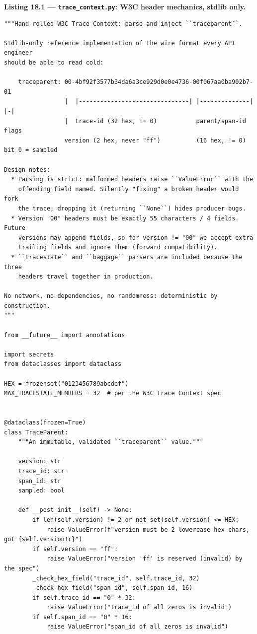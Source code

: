 \noindent\textbf{Listing 18.1 --- \texttt{trace\_context.py}: W3C header
mechanics, stdlib only.}
\label{lst:ch18-trace-context}
\begin{verbatim}
"""Hand-rolled W3C Trace Context: parse and inject ``traceparent``.

Stdlib-only reference implementation of the wire format every API engineer
should be able to read cold:

    traceparent: 00-4bf92f3577b34da6a3ce929d0e0e4736-00f067aa0ba902b7-01
                 |  |-------------------------------| |--------------| |-|
                 |  trace-id (32 hex, != 0)           parent/span-id   flags
                 version (2 hex, never "ff")          (16 hex, != 0)   bit 0 = sampled

Design notes:
  * Parsing is strict: malformed headers raise ``ValueError`` with the
    offending field named. Silently "fixing" a broken header would fork
    the trace; dropping it (returning ``None``) hides producer bugs.
  * Version "00" headers must be exactly 55 characters / 4 fields. Future
    versions may append fields, so for version != "00" we accept extra
    trailing fields and ignore them (forward compatibility).
  * ``tracestate`` and ``baggage`` parsers are included because the three
    headers travel together in production.

No network, no dependencies, no randomness: deterministic by construction.
"""

from __future__ import annotations

import secrets
from dataclasses import dataclass

HEX = frozenset("0123456789abcdef")
MAX_TRACESTATE_MEMBERS = 32  # per the W3C Trace Context spec


@dataclass(frozen=True)
class TraceParent:
    """An immutable, validated ``traceparent`` value."""

    version: str
    trace_id: str
    span_id: str
    sampled: bool

    def __post_init__(self) -> None:
        if len(self.version) != 2 or not set(self.version) <= HEX:
            raise ValueError(f"version must be 2 lowercase hex chars, got {self.version!r}")
        if self.version == "ff":
            raise ValueError("version 'ff' is reserved (invalid) by the spec")
        _check_hex_field("trace_id", self.trace_id, 32)
        _check_hex_field("span_id", self.span_id, 16)
        if self.trace_id == "0" * 32:
            raise ValueError("trace_id of all zeros is invalid")
        if self.span_id == "0" * 16:
            raise ValueError("span_id of all zeros is invalid")


\end{verbatim}
